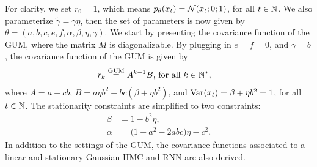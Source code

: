 For clarity, we set $r_0=1$, which means $p_{\theta}(x_t)={\mathcal N}(x_t;0;1)$,
for all $t \in \mathbb{N}$. We also parameterize $\tilde{\gamma}=\gamma \eta$,
then the set of parameters is now given by $\theta=(a,b,c,e,f,\alpha,\beta,\eta,\gamma)$.
We start by presenting the covariance function of the GUM, 
where the matrix $M$ is diagonalizable. 
By plugging in $e=f=0$, and $\gamma=b$, the covariance function of the GUM is given by
\begin{equation}
    \label{eq:covar-gum}
    \begin{aligned}
    r_k & \overset{\text{GUM}}{=}  A^{k-1} B 
     \text{,} \text{ for all } k \in \mathbb{N}^*  \text{,}
    \end{aligned}
\end{equation}
where $A=a+cb$, $B=a\eta b^2 + bc (\beta+ \eta b^2 )$,
and  $\mathrm{Var}(x_t)= \beta+\eta b^2 = 1$, for all $t \in \mathbb{N}$. 
The stationarity constraints are simplified to two constraints:
\begin{align*}
    \beta &= 1 - b^2 \eta \text{,}\\
    \alpha &= \big(1  - a^2 -2abc \big)\eta - c^2 \text{,}
\end{align*}  
In addition to the settings of the GUM, the covariance functions 
associated to a linear and stationary Gaussian HMC and RNN
are also derived.  
